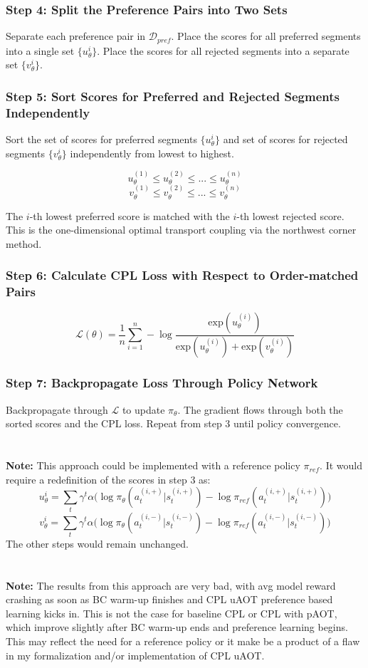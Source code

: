 \documentclass[11pt]{article}
\begin{document}
\subsubsection*{Step 4: Split the Preference Pairs into Two Sets}
Separate each preference pair in $\mathcal{D}_{pref}$. Place the scores for all preferred segments into a single set $\{u_\theta^i\}$. Place the scores for all rejected segments into a separate set $\{v_\theta^i\}$.

\subsubsection*{Step 5: Sort Scores for Preferred and Rejected Segments Independently}
Sort the set of scores for preferred segments $\{u_\theta^i\}$ and set of scores for rejected segments $\{v_\theta^i\}$ independently from lowest to highest.

$$u_\theta^{(1)} \leq u_\theta^{(2)} \leq ...\leq u_\theta^{(n)}$$
$$v_\theta^{(1)} \leq v_\theta^{(2)} \leq ...\leq v_\theta^{(n)}$$

The $i$-th lowest preferred score is matched with the $i$-th lowest rejected score. This is the one-dimensional optimal transport coupling via the northwest corner method.

\subsubsection*{Step 6: Calculate CPL Loss with Respect to Order-matched Pairs}
$$\mathcal{L}(\theta)=\frac{1}{n}\sum_{i=1}^{n}-\log \frac{\text{exp}(u_\theta^{(i)})}{\text{exp}(u_\theta^{(i)})+\text{exp}(v_\theta^{(i)})}$$

\subsubsection*{Step 7: Backpropagate Loss Through Policy Network}
Backpropagate through $\mathcal{L}$ to update $\pi_\theta$. The gradient flows through both the sorted scores and the CPL loss. Repeat from step 3 until policy convergence.\\ \\ \\ \textbf{Note:} This approach could be implemented with a reference policy $\pi_{ref}$. It would require a redefinition of the scores in step 3 as:
$$u_\theta^i = \sum_{t}\gamma^t \alpha \big(\log \pi_\theta(a_t^{(i,+)}|s_t^{(i,+)}) - \log \pi_{ref}(a_t^{(i,+)}|s_t^{(i,+)})\big)$$
$$v_\theta^i = \sum_{t}\gamma^t \alpha \big(\log \pi_\theta(a_t^{(i,-)}|s_t^{(i,-)}) - \log \pi_{ref}(a_t^{(i,-)}|s_t^{(i,-)})\big)$$
The other steps would remain unchanged.
\\ \\ \\ \textbf{Note:} The results from this approach are very bad, with avg model reward crashing as soon as BC warm-up finishes and CPL uAOT preference based learning kicks in. This is not the case for baseline CPL or CPL with pAOT, which improve slightly after BC warm-up ends and preference learning begins. This may reflect the need for a reference policy or it make be a product of a flaw in my formalization and/or implementation of CPL uAOT.
\newpage
\end{document}
